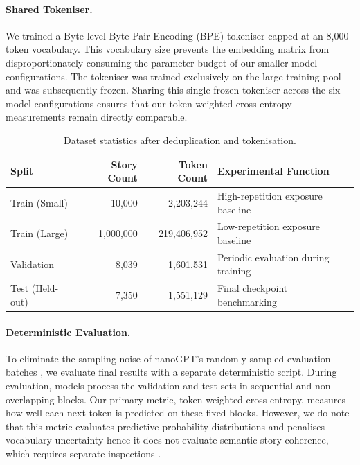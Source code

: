\documentclass[12pt]{article}
\begin{document}
\paragraph{Shared Tokeniser.} We trained a Byte-level Byte-Pair Encoding (BPE) tokeniser capped at an 8,000-token vocabulary. This vocabulary size prevents the embedding matrix from disproportionately consuming the parameter budget of our smaller model configurations. The tokeniser was trained exclusively on the large training pool and was subsequently frozen. Sharing this single frozen tokeniser across the six model configurations ensures that our token-weighted cross-entropy measurements remain directly comparable.

\begin{table}[h]
\centering
\caption{Dataset statistics after deduplication and tokenisation.}
\label{tab:dataset_stats}
\begin{tabular}{lrrl}
\toprule
\textbf{Split} & \textbf{Story Count} & \textbf{Token Count} & \textbf{Experimental Function} \\
\midrule
Train (Small) & 10,000 & 2,203,244 & High-repetition exposure baseline \\
Train (Large) & 1,000,000 & 219,406,952 & Low-repetition exposure baseline \\
Validation & 8,039 & 1,601,531 & Periodic evaluation during training \\
Test (Held-out) & 7,350 & 1,551,129 & Final checkpoint benchmarking \\
\bottomrule
\end{tabular}
\end{table}

\paragraph{Deterministic Evaluation.} To eliminate the sampling noise of nanoGPT's randomly sampled evaluation batches \citep{karpathy2022nanogpt}, we evaluate final results with a separate deterministic script. During evaluation, models process the validation and test sets in sequential and non-overlapping blocks. Our primary metric, token-weighted cross-entropy, measures how well each next token is predicted on these fixed blocks.
However, we do note that this metric evaluates predictive probability distributions and penalises vocabulary uncertainty hence it does not evaluate semantic story coherence, which requires separate inspections \citep{eldan2023tinystories}.

\end{document}
